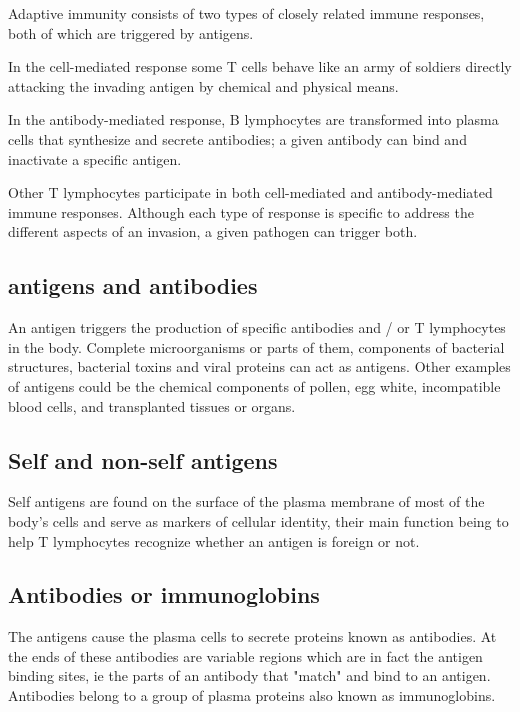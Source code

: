 Adaptive immunity consists of two types of closely related immune responses, both of which are triggered by antigens.

In the cell-mediated response some T cells behave like an army of soldiers directly attacking the invading antigen by chemical and physical means.

In the antibody-mediated response, B lymphocytes are transformed into plasma cells that synthesize and secrete antibodies; a given antibody can bind and inactivate a specific antigen.

Other T lymphocytes participate in both cell-mediated and antibody-mediated immune responses. Although each type of response is specific to address the different aspects of an invasion, a given pathogen can trigger both.

\subsection{antigens and antibodies}

An antigen triggers the production of specific antibodies and / or T lymphocytes in the body. Complete microorganisms or parts of them, components of bacterial structures, bacterial toxins and viral proteins can act as antigens. Other examples of antigens could be the chemical components of pollen, egg white, incompatible blood cells, and transplanted tissues or organs.

\subsection{Self and non-self antigens}

Self antigens are found on the surface of the plasma membrane of most of the body's cells and serve as markers of cellular identity, their main function being to help T lymphocytes recognize whether an antigen is foreign or not.

\subsection{Antibodies or immunoglobins}
The antigens cause the plasma cells to secrete proteins known as antibodies. At the ends of these antibodies are variable regions which are in fact the antigen binding sites, ie the parts of an antibody that "match" and bind to an antigen. Antibodies belong to a group of plasma proteins also known as immunoglobins.

\pagebreak
